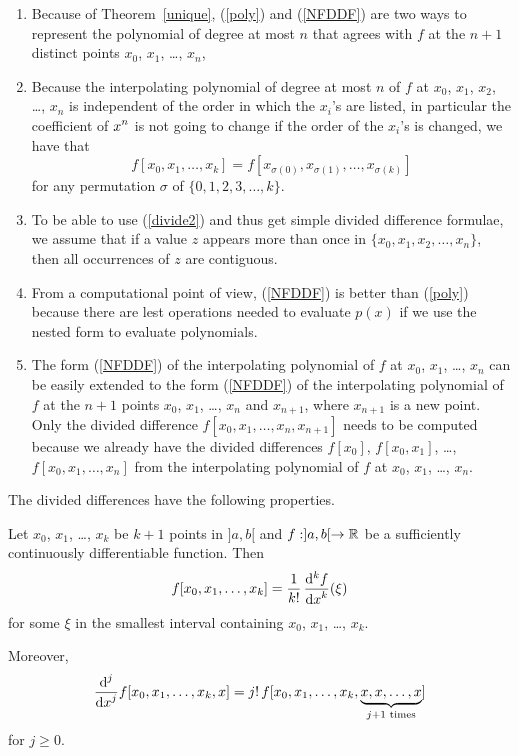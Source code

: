 \begin{rmkList}
\begin{enumerate}
\item Because of Theorem~\ref{unique}, (\ref{poly}) and (\ref{NFDDF}) are
two ways to represent the polynomial of degree at most $n$ that agrees
with $f$ at the $n+1$ distinct points $x_0$, $x_1$, \ldots, $x_n$,
\item Because the interpolating polynomial of degree at most $n$ of
$f$ at $x_0$, $x_1$, $x_2$, \ldots, $x_n$ is independent of the order
in which the $x_i$'s are listed, in particular the coefficient of
$\DS x^n$ is not going to change if the order of the $x_i$'s
is changed, we have that
\[
f[x_0,x_1,\ldots,x_k] = f[x_{\sigma(0)},x_{\sigma(1)},\ldots,x_{\sigma(k)}]
\]
for any permutation $\sigma$ of $\{0,1,2,3,\ldots, k\}$.
\item To be able to use (\ref{divide2}) and thus get simple divided
difference formulae, we assume that if a value $z$ appears 
more than once in $\{ x_0, x_1, x_2, \ldots, x_n\}$, then all occurrences
of $z$ are contiguous.
\item From a computational point of view, (\ref{NFDDF}) is better than
(\ref{poly}) because there are lest operations needed to evaluate
$p(x)$ if we use the nested form to evaluate polynomials.
\item The form (\ref{NFDDF}) of the interpolating polynomial of $f$ at
$x_0$, $x_1$, \ldots, $x_n$ can be easily extended to the
form (\ref{NFDDF}) of the interpolating polynomial of $f$ at the
$n+1$ points $x_0$, $x_1$, \ldots, $x_n$ and $x_{n+1}$, where
$x_{n+1}$ is a new point.  Only the divided difference
$f[x_0,x_1,\ldots,x_n,x_{n+1}]$ needs to be computed because we
already have the divided differences $f[x_0]$, $f[x_0,x_1]$, \ldots,
$f[x_0,x_1,\ldots, x_n]$ from the interpolating polynomial of $f$ at
$x_0$, $x_1$, \ldots, $x_n$.
\end{enumerate}
\end{rmkList}

The divided differences have the following properties.

\begin{theorem}
Let $x_0$, $x_1$, \ldots , $x_k$ be $k+1$ points in $]a,b[$ and
$f:]a,b[\rightarrow \RR$ be a sufficiently continuously differentiable
function.  Then
\[
f[x_0,x_1,\ldots,x_k] = \frac{1}{k!}\,\dydxn{f}{x}{k}(\xi)
\]
for some $\xi$ in the smallest interval containing $x_0$, $x_1$,
\ldots , $x_k$.

Moreover,
\begin{equation}\label{derDDF}
\dfdxn{f[x_0,x_1,\ldots,x_k,x]}{x}{j} =
j!\,f[x_0,x_1,\ldots,x_k,\underbrace{x,x,\ldots,x}_{j+1 \text{ times}}]
\end{equation}
for $j\geq 0$.
\label{InterpProp}
\end{theorem}

